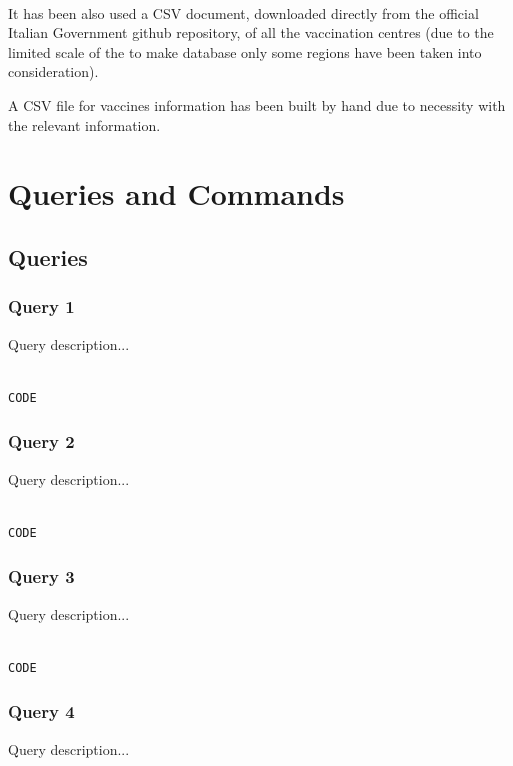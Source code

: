 \documentclass{article}
\begin{document}
\\
\hfill\break
It has been also used a CSV document, downloaded directly from the official Italian Government github repository, of all the vaccination centres (due to the limited scale of the to make database only some regions have been taken into consideration).

A CSV file for vaccines information has been built by hand due to necessity with the relevant information.


\newpage
\section{Queries and Commands}
\subsection{Queries}
\subsubsection{Query 1}
Query description...

\begin{lstlisting}[language=cypher, label=lst:cypher-example]

CODE

\end{lstlisting}
\subsubsection{Query 2}
Query description...

\begin{lstlisting}[language=cypher, label=lst:cypher-example]

CODE

\end{lstlisting}
\subsubsection{Query 3}
Query description...

\begin{lstlisting}[language=cypher, label=lst:cypher-example]

CODE

\end{lstlisting}

\subsubsection{Query 4}
Query description...
\end{document}
